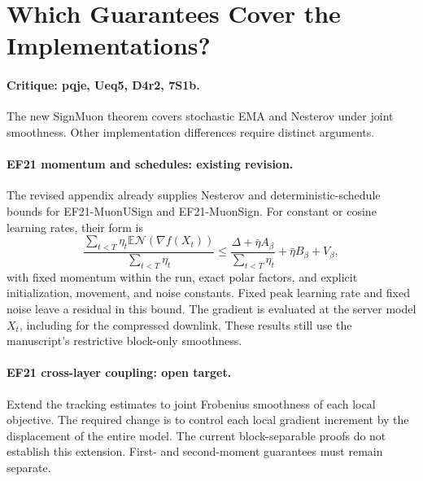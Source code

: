 \section{Which Guarantees Cover the Implementations?}
\label{add:coverage}
\paragraph{Critique: pqje, Ueq5, D4r2, 7S1b.}
The new SignMuon theorem covers stochastic EMA and Nesterov under joint
smoothness. Other implementation differences require distinct arguments.

\paragraph{EF21 momentum and schedules: existing revision.}
The revised appendix already supplies Nesterov and deterministic-schedule
bounds for EF21-MuonUSign and EF21-MuonSign. For constant or cosine learning
rates, their form is
\[
 \frac{\sum_{t<T}\eta_t\mathbb E\mathcal N(\nabla f(X_t))}
      {\sum_{t<T}\eta_t}
 \le\frac{\Delta+\bar\eta A_\beta}{\sum_{t<T}\eta_t}
       +\bar\eta B_\beta+V_\beta,
\]
with fixed momentum within the run, exact polar factors, and explicit
initialization, movement, and noise constants. Fixed peak learning rate
and fixed noise leave a residual in this bound. The gradient is evaluated
at the server model $X_t$, including for the compressed downlink.
These results still use the manuscript's restrictive block-only smoothness.

\paragraph{EF21 cross-layer coupling: open target.}
Extend the tracking estimates to joint Frobenius smoothness of each local
objective. The required change is to control each local gradient increment
by the displacement of the entire model. The current block-separable proofs
do not establish this extension. First- and second-moment guarantees must
remain separate.

